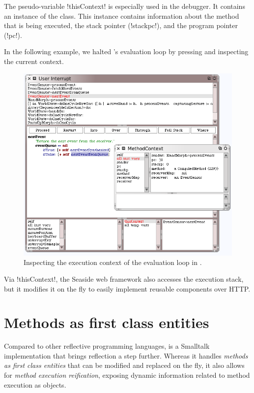 \documentclass[a4paper,10pt,twoside]{book}
\begin{document}
The pseudo-variable \ct!thisContext! is especially used in the \sq debugger.
It contains an instance of the  class.
This instance contains information about the method that is being executed, the stack pointer (\ct!stackpc!), and the program pointer (\ct!pc!).

In the following example, we halted \sq's evaluation loop by pressing  and inspecting the current context.

\begin{figure}[ht]\centering
	\includegraphics[width=\linewidth]{MethodContext}
	\caption{Inspecting the execution context of the evaluation loop in \sq.\label{fig:MethodContext}}
\end{figure}

Via \ct!thisContext!, the Seaside web framework also accesses the execution stack, but it modifies it on the fly to easily implement reusable components over HTTP.


\section{Methods as first class entities}

Compared to other reflective programming languages, \sq is a Smalltalk implementation that brings reflection a step further. Whereas it handles \emph{methods as first class entities} that can be modified and replaced on the fly, it also allows for \emph{method execution reification}, exposing dynamic information related to method execution as objects.
\end{document}
